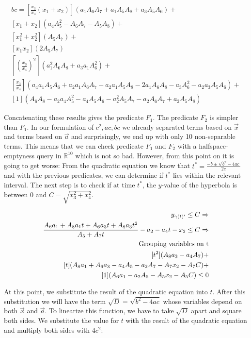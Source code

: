 \documentclass[UKenglish]{lipics-v2019}
\begin{document}
\begin{align*}
     bc =
     \left[\frac{x_3}{x_4}(x_1 + x_2)\right](a_1 A_6 A_7 + a_1 A_5 A_8 + a_3 A_5 A_6) + \\
     [x_1 + x_2](  a_4 A_5^2- A_6 A_7- A_5 A_8) +\\
    [x_1^2 + x_2^2](A_5 A_7) + \\
    [x_1x_2](2 A_5 A_7) \\
    \left [\left( \frac{x_3}{x_4} \right)^2 \right](a_1^2 A_6 A_8+ a_3 a_1 A_6^2 ) + \\
    \left[\frac{x_3}{x_4}\right](  a_4 a_1 A_5 A_6+ a_2 a_1 A_6 A_7- a_2 a_1 A_5 A_8- 2 a_1 A_6 A_8- a_3 A_6^2- a_2 a_3 A_5 A_6) +\\  [1](A_6 A_8- a_2 a_4 A_5^2- a_4 A_5 A_6 - a_2^2 A_5 A_7 - a_2 A_6 A_7 + a_2 A_5 A_8)
\end{align*}


Concatenating these results gives the predicate $F_1$. The predicate $F_2$ is simpler than $F_1$. In our formulation of $c^2, ac, bc$ we already separated terms based on $\vec{x}$ and terms based on $\vec{a}$ and surprisingly, we end up with only 10 non-separable terms. This means that we can check predicate $F_1$ and $F_2$ with a halfspace-emptyness query in $\mathbb{R}^10$ which is not so bad. However, from this point on it is going to get worse:
From the quadratic equation we know that $t^* = \frac{-b \pm \sqrt{b^2 - 4ac}}{2c}$ and with the previous predicates, we can determine if $t^*$ lies within the relevant interval. The next step is to check if at time $t^*$, the $y$-value of the hyperbola is between $0$ and $C =\sqrt{x_3^2 + x_4^2}$.




\begin{align*}
     y_{\gamma(t)'} \le C \Rightarrow \\
\frac{ A_6 a_1 + A_8 a_1 t + A_6 a_3 t + A_8 a_3 t^2 }{A_5 + A_7t} - a_2 - a_4 t - x_2 \le C \Rightarrow \\
%
      \textnormal{Grouping variables on t} \\
[t^2](A_8 a_3-a_4 A_7) + \\
[t](A_8 a_1+ A_6 a_3 - a_4 A_5- a_2 A_7 - A_7x_2 - A_7 C) + \\
[1](A_6 a_1- a_2 A_5 - A_5 x_2 - A_5 C)   \le 0 \\
%
\end{align*}

At this point, we substitute the result of the quadratic equation into $t$. After this substitution we will have the term $\sqrt{D} = \sqrt{b^2 - 4ac}$ whose variables depend on both $\vec{x}$ and $\vec{a}$. To linearize this function, we have to take $\sqrt{D}$ apart and square both sides. We substitute the value for $t$ with the result of the quadratic equation and multiply both sides with $4c^2$:
\end{document}
